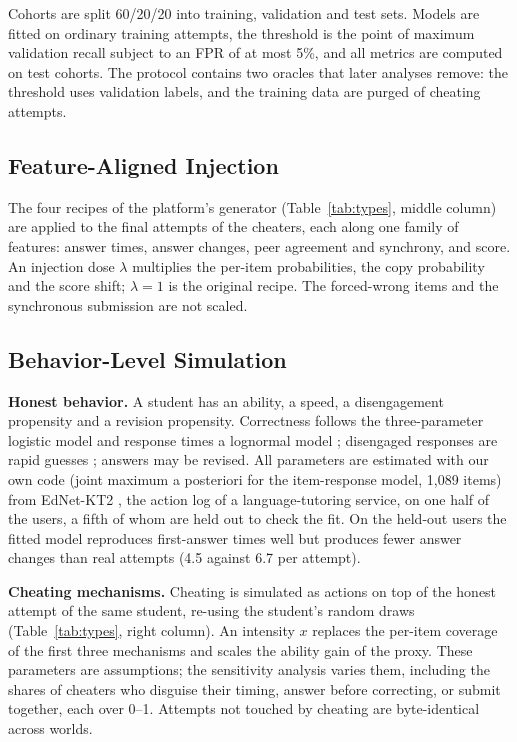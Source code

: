 \documentclass[conference,a4paper]{IEEEtran}
\begin{document}
Cohorts are split 60/20/20 into training, validation and test sets. Models are fitted on ordinary training attempts, the threshold is the point of maximum validation recall subject to an FPR of at most 5\%, and all metrics are computed on test cohorts. The protocol contains two oracles that later analyses remove: the threshold uses validation labels, and the training data are purged of cheating attempts.

\subsection{Feature-Aligned Injection}
The four recipes of the platform's generator (Table~\ref{tab:types}, middle column) are applied to the final attempts of the cheaters, each along one family of features: answer times, answer changes, peer agreement and synchrony, and score. An injection dose $\lambda$ multiplies the per-item probabilities, the copy probability and the score shift; $\lambda = 1$ is the original recipe. The forced-wrong items and the synchronous submission are not scaled.

\subsection{Behavior-Level Simulation}
\textbf{Honest behavior.} A student has an ability, a speed, a disengagement propensity and a revision propensity. Correctness follows the three-parameter logistic model and response times a lognormal model \cite{vanderlinden2006lognormal,vanderlinden2007hierarchical}; disengaged responses are rapid guesses \cite{wise2005rte}; answers may be revised. All parameters are estimated with our own code (joint maximum a posteriori for the item-response model, 1,089 items) from EdNet-KT2 \cite{choi2020ednet}, the action log of a language-tutoring service, on one half of the users, a fifth of whom are held out to check the fit. On the held-out users the fitted model reproduces first-answer times well but produces fewer answer changes than real attempts (4.5 against 6.7 per attempt).

\textbf{Cheating mechanisms.} Cheating is simulated as actions on top of the honest attempt of the same student, re-using the student's random draws (Table~\ref{tab:types}, right column). An intensity $x$ replaces the per-item coverage of the first three mechanisms and scales the ability gain of the proxy. These parameters are assumptions; the sensitivity analysis varies them, including the shares of cheaters who disguise their timing, answer before correcting, or submit together, each over 0--1. Attempts not touched by cheating are byte-identical across worlds.
\end{document}
